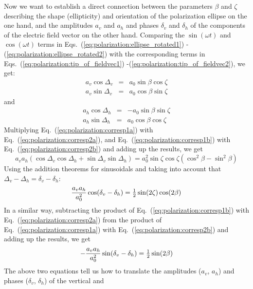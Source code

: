 Now we want to establish a direct connection between the parameters
$\beta$ and $\zeta$ describing the shape (ellipticity) and orientation
of the polarization ellipse on the one hand, and the amplitudes $a_v$
and $a_h$ and phases $\delta_v$ and $\delta_h$ of the components of
the electric field vector on the other hand.  Comparing the
$\sin(\omega t)$ and $\cos(\omega t)$ terms in
Eqs.~(\ref{eq:polarization:ellipse_rotated1})%
-(\ref{eq:polarization:ellipse_rotated2}) with the corresponding terms
in Eqs.~(\ref{eq:polarization:tip_of_fieldvec1})%
-(\ref{eq:polarization:tip_of_fieldvec2}), we get:
\begin{eqnarray}
  \label{eq:polarization:corresp1a}
 a_v \cos\Delta_v &=& a_0 \sin\beta \cos\zeta\\
  \label{eq:polarization:corresp1b}
 a_v \sin\Delta_v &=& a_0 \cos\beta \sin\zeta
\end{eqnarray}
and 
\begin{eqnarray}
  \label{eq:polarization:corresp2a}
 a_h \cos\Delta_h &=& -a_0 \sin\beta \sin\zeta\\
  \label{eq:polarization:corresp2b}
 a_h \sin\Delta_h &=&  a_0 \cos\beta \cos\zeta
\end{eqnarray}
Multiplying Eq.~(\ref{eq:polarization:corresp1a}) with
Eq.~(\ref{eq:polarization:corresp2a}), and
Eq.~(\ref{eq:polarization:corresp1b}) with
Eq.~(\ref{eq:polarization:corresp2b}) and adding up the results, we get
\begin{equation}
  a_v a_h (\cos\Delta_v\cos\Delta_h + \sin\Delta_v\sin\Delta_h)
  = a_0^2 \sin\zeta\cos\zeta (\cos^2\beta - \sin^2\beta) 
\end{equation}
Using the addition theorems for sinusoidals and taking into account
that
$\Delta_v-\Delta_h = \delta_v-\delta_h$:
\begin{equation}
  \label{eq:polarization:sinzetacosbeta}
  \frac{a_v a_h}{a_0^2} \cos(\delta_v-\delta_h)
  = \textstyle\frac{1}{2}\sin(2\zeta)\cos(2\beta)
\end{equation}
In a similar way, subtracting the product of
Eq.~(\ref{eq:polarization:corresp1b}) with
Eq.~(\ref{eq:polarization:corresp2a}) from the product of
Eq.~(\ref{eq:polarization:corresp1a}) with
Eq.~(\ref{eq:polarization:corresp2b}) and adding up the results, we get
\begin{equation}
  \label{eq:polarization:sinbeta}
  -\frac{a_v a_h}{a_0^2} \sin(\delta_v-\delta_h)
  = \textstyle\frac{1}{2}\sin(2\beta)
\end{equation}
The above two equations tell us how to translate the amplitudes
($a_v$, $a_h$) and phases ($\delta_v$, $\delta_h$) of the vertical and
